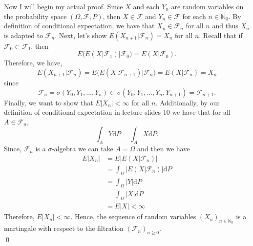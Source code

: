\documentclass[10pt]{amsart}
\newcommand{\D}{\mathrm{d}}
\begin{document}
\noindent
Now I will begin my actual proof.
Since $X$ and each $Y_n$ are random variables on the probability space $(\Omega, \mathcal F, P)$, then $X \in \mathcal F$ and $Y_n \in \mathcal F$ for each $n \in \mathbb N_0$.
By definition of conditional expectation, we have that $X_n \in \mathcal F_n$ for all $n$ and thus $X_n$ is adapted to $\mathcal F_n$.
Next, let's show $E (X_{n + 1} | \mathcal F_n) = X_n$ for all $n$.
Recall that if $\mathcal F_0 \subset \mathcal F_1$, then
$$
E\big(E(X|\mathcal F_1) \big|\mathcal F_0\big) = E(X|\mathcal F_0).
$$
Therefore, we have,
$$
E (X_{n + 1}|\mathcal F_n) = E \big( E(X | \mathcal F_{n + 1} ) \big| \mathcal F_n\big) = E(X | \mathcal F_n ) = X_n
$$
since
$$
\mathcal F_n = \sigma(Y_0, Y_1, ..., Y_n) \subset \sigma(Y_0, Y_1, ..., Y_n, Y_{n + 1}) = \mathcal F_{n + 1}.
$$
Finally, we want to show that $E | X_n | < \infty$ for all $n$.
Additionally, by our definition of conditional expectation in lecture slides 10 we have that for all $A \in \mathcal F_n$,
$$\int_{A} Y \D P = \int_{A} X \D P.$$
Since, $\mathcal F_n$ is a $\sigma$-algebra we can take $A = \Omega$ and then we have
\begin{align*}
E | X_n |  &= E \big| E (X | \mathcal F_n) \big| \\
	&= \int_\Omega \big|E (X | \mathcal F_n ) \big|\D P \\
	&= \int_\Omega |Y| \D P \\
	&= \int_\Omega |X| \D P \\
	&= E |X| < \infty
\end{align*}
Therefore, $E | X_n | < \infty$. Hence, the sequence of random variables $(X_n)_{n \in \mathbb N_0}$ is a martingale with respect to the filtration $(\mathcal{F}_n)_{n \geq 0}$.\\
\qed \\
\newpage
\end{document}
